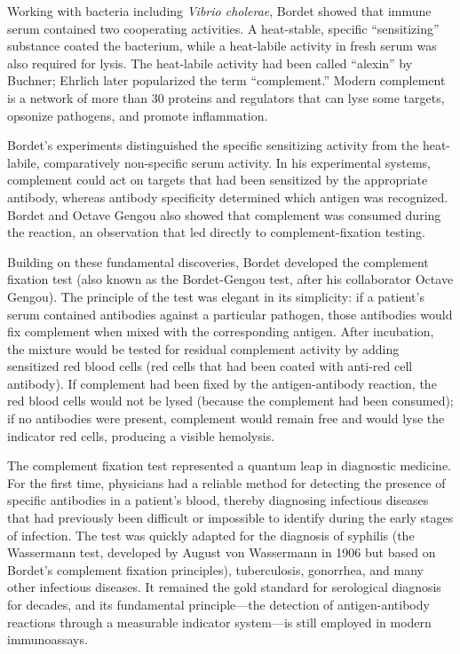 Working with bacteria including \emph{Vibrio cholerae}, Bordet showed that immune serum contained two cooperating activities. A heat-stable, specific ``sensitizing'' substance coated the bacterium, while a heat-labile activity in fresh serum was also required for lysis. The heat-labile activity had been called ``alexin'' by Buchner; Ehrlich later popularized the term ``complement.'' Modern complement is a network of more than 30 proteins and regulators that can lyse some targets, opsonize pathogens, and promote inflammation.\cite{bordet-history}

Bordet's experiments distinguished the specific sensitizing activity from the heat-labile, comparatively non-specific serum activity. In his experimental systems, complement could act on targets that had been sensitized by the appropriate antibody, whereas antibody specificity determined which antigen was recognized. Bordet and Octave Gengou also showed that complement was consumed during the reaction, an observation that led directly to complement-fixation testing.\cite{bordet-history}

Building on these fundamental discoveries, Bordet developed the complement fixation test (also known as the Bordet-Gengou test, after his collaborator Octave Gengou). The principle of the test was elegant in its simplicity: if a patient's serum contained antibodies against a particular pathogen, those antibodies would fix complement when mixed with the corresponding antigen. After incubation, the mixture would be tested for residual complement activity by adding sensitized red blood cells (red cells that had been coated with anti-red cell antibody). If complement had been fixed by the antigen-antibody reaction, the red blood cells would not be lysed (because the complement had been consumed); if no antibodies were present, complement would remain free and would lyse the indicator red cells, producing a visible hemolysis.

The complement fixation test represented a quantum leap in diagnostic medicine. For the first time, physicians had a reliable method for detecting the presence of specific antibodies in a patient's blood, thereby diagnosing infectious diseases that had previously been difficult or impossible to identify during the early stages of infection. The test was quickly adapted for the diagnosis of syphilis (the Wassermann test, developed by August von Wassermann in 1906 but based on Bordet's complement fixation principles), tuberculosis, gonorrhea, and many other infectious diseases. It remained the gold standard for serological diagnosis for decades, and its fundamental principle---the detection of antigen-antibody reactions through a measurable indicator system---is still employed in modern immunoassays.

